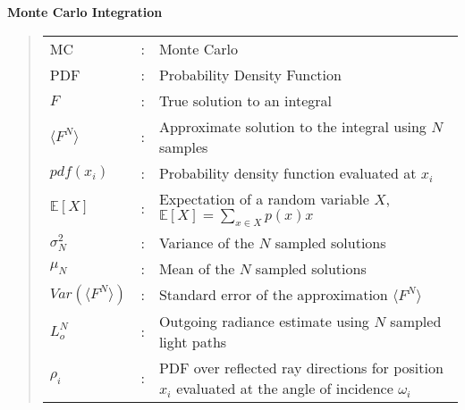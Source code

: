 \documentclass[../dissertation.tex]{subfiles}
\begin{document}
\noindent
\textbf{Monte Carlo Integration}
\begin{quote}
\noindent
\begin{tabular}{lcl}

MC  &: & Monte Carlo\\
PDF  &: & Probability Density Function\\
$F$ &: & True solution to an integral\\
$\langle F^N \rangle$ &: & Approximate solution to the integral using $N$ samples\\
$pdf(x_i)$ &: & Probability density function evaluated at $x_i$\\
$\mathbb{E}[X]$ &: & Expectation of a random variable $X$, $\mathbb{E}[X] = \sum_{x \in X} p(x)x$\\
$\sigma^2_N$ &: & Variance of the $N$ sampled solutions\\
$\mu_N$ &: & Mean of the $N$ sampled solutions\\
$Var(\langle F^N \rangle)$ &: & Standard error of the approximation $\langle F^N \rangle$\\
$L_o^N$ &: & Outgoing radiance estimate using $N$ sampled light paths\\
$\rho_i$ &: & PDF over reflected ray directions for position $x_i$ evaluated at the angle of incidence $\omega_i$\\

\end{tabular}
\end{quote}
\end{document}
